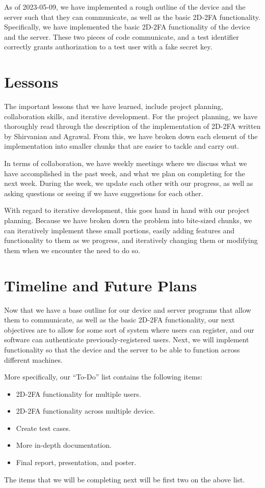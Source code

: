 \documentclass{article} %
\begin{document}
As of 2023-05-09, we have implemented a rough outline of the device and
the server such that they can communicate, as well as the basic 2D-2FA
functionality. Specifically, we have implemented the basic 2D-2FA
functionality of the device and the server. These two pieces of code
communicate, and a test identifier correctly grants authorization to a
test user with a fake secret key. 

\section{Lessons}

The important lessons that we have learned, include project planning,
collaboration skills, and iterative development. For the project
planning, we have thoroughly read through the description of the
implementation of 2D-2FA written by Shirvanian and Agrawal. From this,
we have broken down each element of the implementation into smaller
chunks that are easier to tackle and carry out.

In terms of collaboration, we have weekly meetings where we discuss what
we have accomplished in the past week, and what we plan on completing
for the next week. During the week, we update each other with our
progress, as well as asking questions or seeing if we have suggestions
for each other. 

With regard to iterative development, this goes hand in hand with our
project planning. Because we have broken down the problem into
bite-sized chunks, we can iteratively implement these small portions,
easily adding features and functionality to them as we progress, and
iteratively changing them or modifying them when we encounter the need
to do so.

\section{Timeline and Future Plans}

Now that we have a base outline for our device and server programs that
allow them to communicate, as well as the basic 2D-2FA functionality,
our next objectives are to allow for some sort of system where users can
register, and our software can authenticate previously-registered users.
Next, we will implement functionality so that the device and the server
to be able to function across different machines. 

More specifically, our ``To-Do'' list contains the following items:
\begin{itemize}
    \item 2D-2FA functionality for multiple users.
    \item 2D-2FA functionality across multiple device.
    \item Create test cases.
    \item More in-depth documentation.
    \item Final report, presentation, and poster.
\end{itemize}
The items that we will be completing next will be first two on the above
list. 

\end{document}
